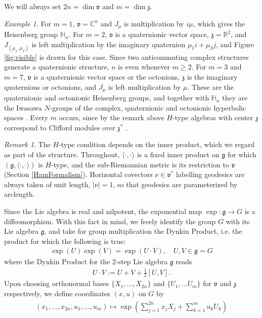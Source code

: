 \documentclass[11pt]{amsart}
\theoremstyle{plain}
\theoremstyle{definition}
\theoremstyle{remark}
\newtheorem{remark}[theorem]{Remark}
\numberwithin{equation}{section}
\newtheorem{example}[theorem]{Example}
\def\fz{\mathfrak{z}}
\def\fg{\mathfrak{g}}
\def\fv{\mathfrak{v}}
\def\R{{\mathbb R}}%
\def\C{{\mathbb C}}%
\def \heis {\mathbb{H}}
\numberwithin{equation}{section}
\begin{document}
We will always set $2n=\dim \fv$ and $m=\dim \fz$. 
\begin{example}\label{ex:htype}
	For $m=1$, $\fv=\C^n$ and $J_\mu$ is multiplication by $i\mu$, which gives the Heisenberg group $\heis_n$. For $m=2$, $\fv$ is a quaternionic vector space, $\fz=\R^2$, and $J_{(\mu_1, \mu_2)}$ is left multiplication by the imaginary quaternion $\mu_1 i+\mu_2 j$, and Figure \ref{fig:visible} is drawn for this case. Since two anticommuting complex structures generate a quaternionic structure, $n$ is even whenever $m\geq 2$. For $m=3$ and $m=7$, $\fv$ is a quaternionic vector space or the octonions, $\fz$ is the imaginary quaternions or octonions, and $J_\mu$ is left multiplication by $\mu$. These are the quaternionic and octonionic Heisenberg groups, and together with $\heis_n$ they are the Iwasawa $N$-groups of the complex, quaternionic and octonionic hyperbolic spaces \cite{cowlingHTypeGroupsLwasawa}. Every $m$ occurs, since by the remark above $H$-type algebras with center $\fz$ correspond to Clifford modules over $\fz^*$ \cite{kaplanFundamentalSolutionsClass1980}.
\end{example}
\begin{remark}
	The $H$-type condition depends on the inner product, which we regard as part of the structure. Throughout, $\langle\cdot, \cdot\rangle$ is a fixed inner product on $\fg$ for which $(\fg, \langle\cdot, \cdot\rangle)$ is $H$-type, and the sub-Riemannian metric is its restriction to $\fv$ (Section \ref{HamFormalism}). Horizontal covectors $\nu\in \fv^*$ labelling geodesics are always taken of unit length, $|\nu|=1$, so that geodesics are parameterized by arclength.
\end{remark}
Since the Lie algebra is real and nilpotent, the exponential map $\exp: \mathfrak{g}\to G$ is a diffeomorphism. With this fact in mind, we freely identify the group $G$ with its Lie algebra $\fg$, and take for group multiplication the Dynkin Product, i.e. the product for which the following is true:
\begin{align*}
	\exp(U)\exp(V)=\exp(U\cdot V), \quad U, V\in \fg= G
\end{align*}
where the Dynkin Product for the 2-step Lie algebra $\fg$ reads
\begin{align}
	U\cdot V:=U+V+\tfrac{1}{2}[U, V]. \label{Product}
\end{align}Upon choosing orthonormal bases $\{X_1, \ldots, X_{2n}\}$ and $\{U_1, \ldots U_m\}$ for $\mathfrak{v}$ and $\mathfrak{z}$ respectively, we define coordinates $(x, u)$ on $G$ by
\begin{align*}
	(x_1, \ldots, x_{2n}, u_1, \ldots, u_m)\longmapsto \exp\left(\sum_{j=1}^{2n} x_jX_j+\sum_{k=1}^m u_kU_k\right)
\end{align*}
\end{document}
